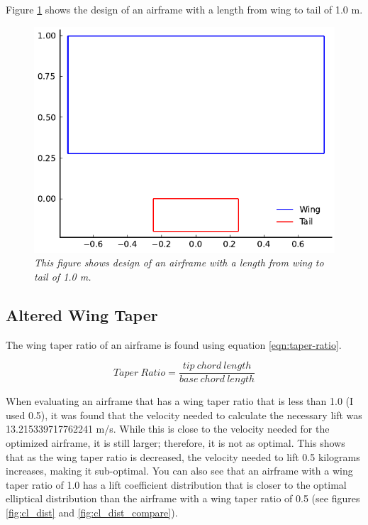 \documentclass{journal}
\begin{document}
	Figure \ref{fig:length_design} shows the design of an airframe with a length from wing to tail of 1.0 m.
	
	\begin{figure}[H]
		\includegraphics{../graphics/length_design.pdf}
		\caption{\emph{This figure shows design of an airframe with a length from wing to tail of 1.0 m.}}
		\label{fig:length_design}
	\end{figure}
	
	\subsection{Altered Wing Taper}
	The wing taper ratio of an airframe is found using equation \ref{eqn:taper-ratio}.
	
	\begin{equation}
		Taper\ Ratio = \frac{tip\ chord\ length}{base\ chord\ length}
		\label{eqn:taper-ratio}
	\end{equation}
	
	When evaluating an airframe that has a wing taper ratio that is less than 1.0 (I used 0.5), it was found that the velocity needed to calculate the necessary lift was 13.215339717762241 m/s. While this is close to the velocity needed for the optimized airframe, it is still larger; therefore, it is not as optimal. This shows that as the wing taper ratio is decreased, the velocity needed to lift 0.5 kilograms increases, making it sub-optimal. You can also see that an airframe with a wing taper ratio of 1.0 has a lift coefficient distribution that is closer to the optimal elliptical distribution than the airframe with a wing taper ratio of 0.5 (see figures \ref{fig:cl_dist} and \ref{fig:cl_dist_compare}).\\
	
\end{document}
